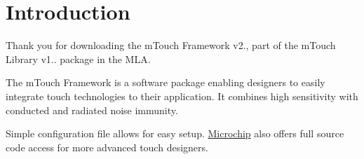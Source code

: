 \hypertarget{index_Intro}{}\section{Introduction}\label{index_Intro}
Thank you for downloading the m\+Touch Framework v2., part of the m\+Touch Library v1.. package in the M\+L\+A.

The m\+Touch Framework is a software package enabling designers to easily integrate touch technologies to their application. It combines high sensitivity with conducted and radiated noise immunity.

Simple configuration file allows for easy setup. \hyperlink{namespace_microchip}{Microchip} also offers full source code access for more advanced touch designers.

~\newline
